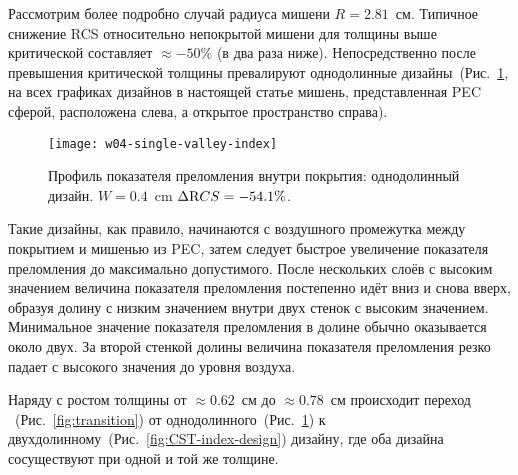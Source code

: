 Рассмотрим более подробно случай радиуса мишени ${R =
  2.81}$~см. Типичное снижение RCS относительно непокрытой мишени для
толщины выше критической составляет ${\approx -50\%}$ (в два
раза ниже). Непосредственно после превышения критической толщины
превалируют однодолинные
дизайны~(Рис.~\ref{fig:single-valley-index-design}, на всех графиках
дизайнов в настоящей статье мишень, представленная PEC сферой,
расположена слева, а открытое пространство справа).
\begin{figure}
  \texttt{[image: w04-single-valley-index]}%
  \caption{Профиль показателя преломления внутри покрытия:
    однодолинный дизайн.  ${W=0.4}$~cm
    $\Delta {\textrm RCS}=-54.1\%$.
    \label{fig:single-valley-index-design}}%
\end{figure}
Такие дизайны, как правило, начинаются с воздушного промежутка между
покрытием и мишенью из PEC, затем следует быстрое увеличение
показателя преломления до максимально допустимого. После нескольких
слоёв с высоким значением величина показателя преломления постепенно
идёт вниз и снова вверх, образуя долину с низким значением внутри двух
стенок с высоким значением. Минимальное значение показателя
преломления в долине обычно оказывается около двух. За второй стенкой
долины величина показателя преломления резко падает с высокого значения до
уровня воздуха.

Наряду с ростом толщины от ${\approx 0.62}$~см до ${\approx 0.78}$~см
происходит переход ~(Рис.~\ref{fig:transition}) от
однодолинного~(Рис.~\ref{fig:single-valley-index-design}) к
двухдолинному~(Рис.~\ref{fig:CST-index-design}) дизайну, где оба
дизайна сосуществуют при одной и той же толщине.

